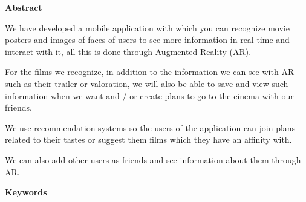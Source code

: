 
\newpage

\thispagestyle{empty}

\begin{center}

{\bf \Huge Abstract}

  \end{center}
\vspace{1cm}

We have developed a mobile application with which you can
 recognize movie posters and images of faces of users to see more
 information in real time and interact with it, all this is done
 through Augmented Reality (AR).

For the films we recognize, in addition to the information
 we can see with AR such as their trailer or
 valoration, we will also be able to save and view such
 information when we want and / or create plans to go to the
 cinema with our friends.

We use recommendation systems so the users of the application can join plans related to
their tastes or suggest them films which they have an affinity with.

We can also add other users as friends and see information about
them through AR.

\vspace{1cm}

\begin{center}

  {\bf \Large Keywords}
  
     \end{center}
  
     \vspace{0.5cm}
     
